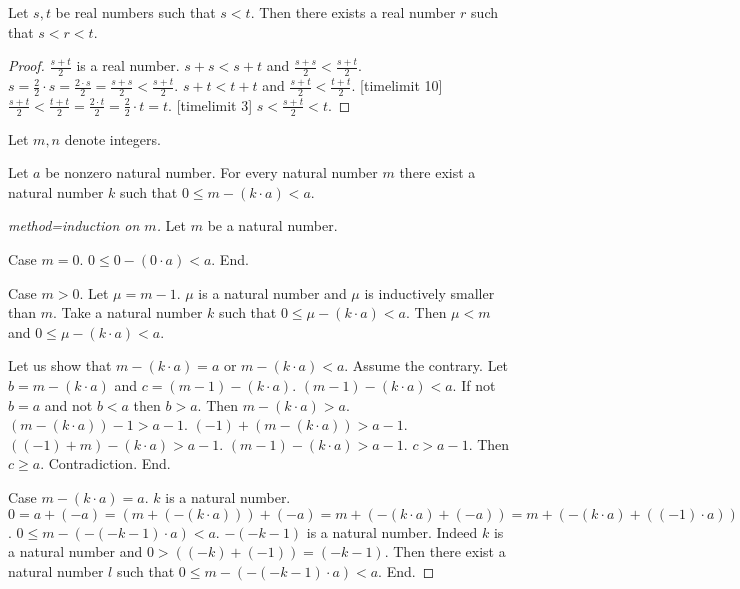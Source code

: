 \documentclass{article}
\begin{document}
\begin{forthel}

\begin{lemma}
Let $s,t$ be real numbers such that $s < t$.
Then there exists a real number $r$ such that $s < r < t$.
\end{lemma}
\begin{proof}
$\frac{s+t}{2}$ is a real number. $s + s < s + t$ and $\frac{s + s}{2} < \frac{s + t}{2}$.
$s = \frac{2}{2} \cdot s = \frac{2 \cdot s}{2} = \frac{s + s}{2} < \frac{s + t}{2}$.
$s + t < t + t$ and $\frac{s + t}{2} < \frac{t + t}{2}$.
[timelimit 10]
$\frac{s+t}{2} < \frac{t+t}{2} = \frac{2 \cdot t}{2} = \frac{2}{2} \cdot t = t$.
[timelimit 3]
$s < \frac{s+t}{2} < t$.
\end{proof}



Let $m,n$ denote integers.


\begin{proposition}
Let $a$ be nonzero natural number.
For every natural number $m$ there exist
a natural number $k$ such that $0 \leq m - (k \cdot a) < a$.
\end{proposition}
\begin{proof}[method=induction on $m$]
Let $m$ be a natural number.

Case $m = 0$.
$0 \leq 0 - (0 \cdot a) < a$. End.

Case $m > 0$. Let $\mu = m-1$.
$\mu$ is a natural number and $\mu$ is inductively smaller than $m$.
Take a natural number $k$ such that $0 \leq \mu - (k \cdot a) < a$.
Then $\mu < m$ and $0 \leq \mu - (k \cdot a) <  a$.

Let us show that $m - (k \cdot a) = a$ or $m - (k \cdot a) < a$.
Assume the contrary.
Let $b = m - (k \cdot a)$ and $c = (m-1) - (k \cdot a)$.
$(m-1) - (k \cdot a) < a$.
If not $b = a$ and not $b < a$ then $b > a$.
Then $m - (k \cdot a) > a$.
$(m - (k \cdot a)) - 1 > a - 1$.
$(-1) + (m - (k\cdot a)) > a - 1$.
$((-1) + m) - (k \cdot a) > a - 1$.
$(m-1) - (k \cdot a) > a - 1$.
$c > a-1$.
Then $c \geq a$.
Contradiction.
End.

Case $m - (k \cdot a) = a$.
$k$ is a natural number.
$0 =
a + (-a) =
(m + (-(k \cdot a))) + (-a) =
m + (-(k \cdot a) + (-a)) =
m + (-(k \cdot a) + ((-1) \cdot a)) =
m + (((-k) \cdot a) + ((-1) \cdot a)) =
m + (((-k)+(-1)) \cdot a) =
m + ((-k-1) \cdot a) =
m - (-(-k-1) \cdot a)$.
$0 \leq m - (-(-k-1) \cdot a) < a$.
$-(-k-1)$ is a natural number.
Indeed $k$ is a natural number and $0 > ((-k) + (-1)) = (-k-1)$.
Then there exist a natural number $l$ such that
$0 \leq m - (-(-k-1) \cdot a) < a$.
End.


\end{proof}
\end{forthel}
\end{document}
